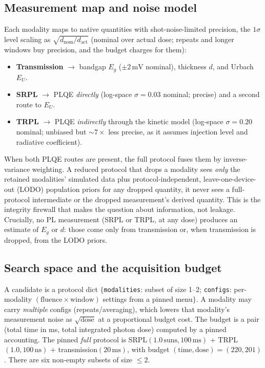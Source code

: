 \documentclass[11pt]{article}
\newcommand{\mV}{\,\mathrm{mV}}
\begin{document}
\subsection{Measurement map and noise model}

Each modality maps to native quantities with shot-noise-limited precision, the $1\sigma$ level scaling as $\sqrt{d_{\mathrm{nom}}/d_{\mathrm{act}}}$ (nominal over actual dose; repeats and longer windows buy precision, and the budget charges for them):
\begin{itemize}
\item \textbf{Transmission} $\rightarrow$ bandgap $E_g$ ($\pm 2\mV$ nominal), thickness $d$, and Urbach $E_U$.
\item \textbf{SRPL} $\rightarrow$ PLQE \emph{directly} (log-space $\sigma=0.03$ nominal; precise) and a second route to $E_U$.
\item \textbf{TRPL} $\rightarrow$ PLQE \emph{indirectly} through the kinetic model (log-space $\sigma=0.20$ nominal; unbiased but ${\sim}7\times$ less precise, as it assumes injection level and radiative coefficient).
\end{itemize}
When both PLQE routes are present, the full protocol fuses them by inverse-variance weighting. A reduced protocol that drops a modality sees \emph{only} the retained modalities' simulated data plus protocol-independent, leave-one-device-out (LODO) population priors for any dropped quantity, it never sees a full-protocol intermediate or the dropped measurement's derived quantity. This is the integrity firewall that makes the question about information, not leakage. Crucially, no PL measurement (SRPL or TRPL, at any dose) produces an estimate of $E_g$ or $d$: those come only from transmission or, when transmission is dropped, from the LODO priors.

\subsection{Search space and the acquisition budget}
\label{sec:space}

A candidate is a protocol dict $\{$\texttt{modalities}: subset of size 1--2; \texttt{configs}: per-modality $(\text{fluence}\times\text{window})$ settings from a pinned menu$\}$. A modality may carry \emph{multiple} configs (repeats/averaging), which lowers that modality's measurement noise as $\sqrt{\text{dose}}$ at a proportional budget cost. The budget is a pair (total time in ms, total integrated photon dose) computed by a pinned accounting. The pinned \emph{full} protocol is SRPL$(1.0\,\text{suns},100\,\text{ms})$ + TRPL$(1.0,100\,\text{ns})$ + transmission$(20\,\text{ms})$, with budget $(\text{time},\text{dose})=(220, 201)$. There are six non-empty subsets of size $\le 2$.
\end{document}
